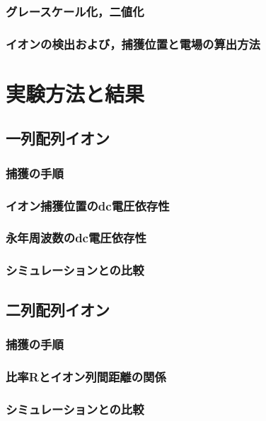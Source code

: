 \documentclass[a4j,10.5pt,titlepage]{jarticle}
\begin{document}
		\subsubsection{グレースケール化，二値化}
		\subsubsection{イオンの検出および，捕獲位置と電場の算出方法}



\section{実験方法と結果}
	\subsection{一列配列イオン}
		\subsubsection{捕獲の手順}
		\subsubsection{イオン捕獲位置のdc電圧依存性}
		\subsubsection{永年周波数のdc電圧依存性}
		\subsubsection{シミュレーションとの比較}
	\subsection{二列配列イオン}
		\subsubsection{捕獲の手順}
		\subsubsection{比率Rとイオン列間距離の関係}
		\subsubsection{シミュレーションとの比較}
	
\end{document}
